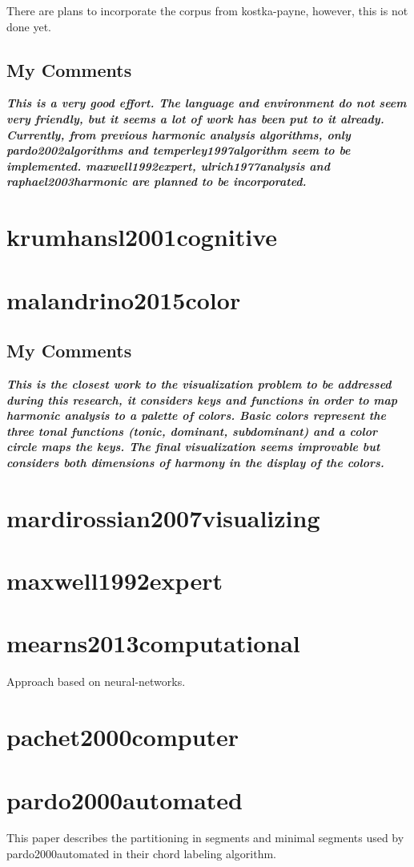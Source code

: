   There are plans to incorporate the corpus from kostka-payne, however, this is not done yet.

  \subsection{My Comments}
  \emph{\textbf{
    This is a very good effort. The language and environment do not seem very friendly, but it seems a lot of work has been put to it already. Currently, from previous harmonic analysis algorithms, only pardo2002algorithms and temperley1997algorithm seem to be implemented. maxwell1992expert, ulrich1977analysis and raphael2003harmonic are planned to be incorporated.
  }}
\section{krumhansl2001cognitive }
\section{malandrino2015color }
  \subsection{My Comments}
    \emph{\textbf{
      This is the closest work to the visualization problem to be addressed during this research, it considers keys and functions in order to map harmonic analysis to a palette of colors. Basic colors represent the three tonal functions (tonic, dominant, subdominant) and a color circle maps the keys. The final visualization seems improvable but considers both dimensions of harmony in the display of the colors.
    }}
\section{mardirossian2007visualizing }
\section{maxwell1992expert }
\section{mearns2013computational }
  Approach based on neural-networks.
\section{pachet2000computer }
\section{pardo2000automated }
  This paper describes the partitioning in segments and minimal segments used by pardo2000automated in their chord labeling algorithm.
